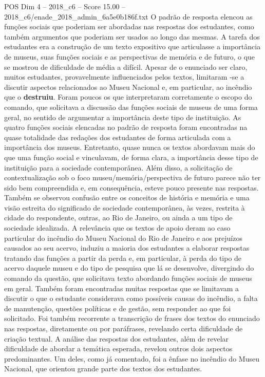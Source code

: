\begin{textsample}{POS Dim 4 – 2018\_c6 – Score 15.00 – 2018\_c6/enade\_2018\_admin\_6a5e0b186f.txt}
O padrão de resposta elencou as funções sociais que poderiam ser abordadas nas respostas dos estudantes, como também argumentos que poderiam ser usados ao longo das mesmas.
A tarefa dos estudantes era a construção de um texto expositivo que articulasse a importância de museus, suas funções sociais e as perspectivas de memória e de futuro, o que se mostrou de dificuldade de média a difícil.
Apesar de o enunciado ser claro, muitos estudantes, provavelmente influenciados pelos textos, limitaram -se a discutir aspectos relacionados ao Museu Nacional e, em particular, ao incêndio que o \textbf{destruiu}.
Foram poucos os que interpretaram corretamente o escopo do comando, que solicitava a discussão das funções sociais de museus de uma forma geral, no sentido de argumentar a importância deste tipo de instituição.
As quatro funções sociais elencadas no padrão de resposta foram encontradas na quase totalidade das redações dos estudantes de forma articulada com a importância dos museus.
Entretanto, quase nunca os textos abordavam mais do que uma função social e vinculavam, de forma clara, a importância desse tipo de instituição para a sociedade contemporânea.
Além disso, a solicitação de contextualização sob o foco museu/memória/perspectiva de futuro parece não ter sido bem compreendida e, em consequência, esteve pouco presente nas respostas.
Também se observou confusão entre os conceitos de história e memória e uma visão estreita do significado de sociedade contemporânea, às vezes, restrita à cidade do respondente, outras, ao Rio de Janeiro, ou ainda a um tipo de sociedade idealizada.
A relevância que os textos de apoio deram ao caso particular do incêndio do Museu Nacional do Rio de Janeiro e aos prejuízos causados ao seu acervo, induziu a maioria dos estudantes a elaborar respostas tratando das funções a partir da perda e, em particular, à perda do tipo de acervo daquele museu e do tipo de pesquisa que lá se desenvolve, divergindo do comando da questão, que solicitava texto abordando funções sociais de museus em geral.
Também foram encontradas muitas respostas que se limitavam a discutir o que o estudante considerava como possíveis causas do incêndio, a falta de manutenção, questões políticas e de gestão, sem responder ao que foi solicitado.
Foi também recorrente a transcrição de frases dos textos do enunciado nas respostas, diretamente ou por paráfrases, revelando certa dificuldade de criação textual.
A análise das respostas dos estudantes, além de revelar dificuldade de abordar a temática esperada, revelou outros dois aspectos predominantes.
Um deles, como já comentado, foi a ênfase no incêndio do Museu Nacional, que orientou grande parte dos textos dos estudantes.

\end{textsample}
